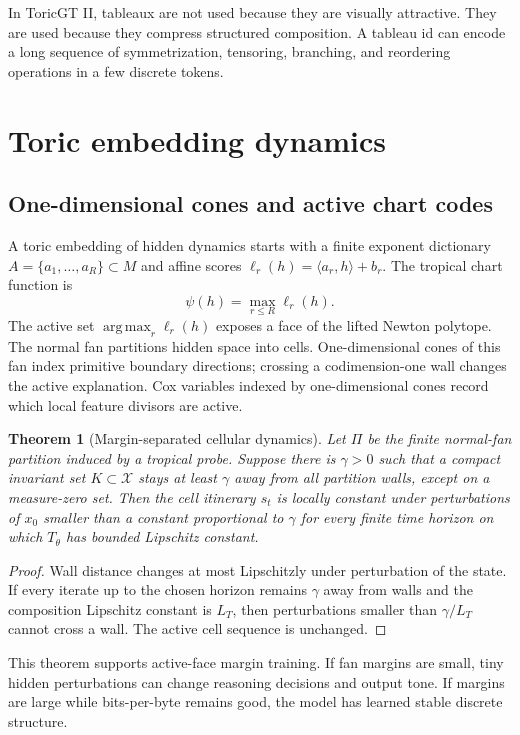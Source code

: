 \documentclass[10pt]{article}
\newtheorem{theorem}{Theorem}[section]
\newcommand{\calX}{\mathcal{X}}
\newcommand{\argmax}{\operatorname*{arg\,max}}
\numberwithin{equation}{section}
\begin{document}
In ToricGT II, tableaux are not used because they are visually attractive. They are used because they compress structured composition. A tableau id can encode a long sequence of symmetrization, tensoring, branching, and reordering operations in a few discrete tokens.

\section{Toric embedding dynamics}
\subsection{One-dimensional cones and active chart codes}
A toric embedding of hidden dynamics starts with a finite exponent dictionary $A=\{a_1,\ldots,a_R\}\subset M$ and affine scores $\ell_r(h)=\langle a_r,h\rangle+b_r$. The tropical chart function is
\begin{equation}
\psi(h)=\max_{r\le R}\ell_r(h).
\end{equation}
The active set $\argmax_r\ell_r(h)$ exposes a face of the lifted Newton polytope. The normal fan partitions hidden space into cells. One-dimensional cones of this fan index primitive boundary directions; crossing a codimension-one wall changes the active explanation. Cox variables indexed by one-dimensional cones record which local feature divisors are active.

\begin{theorem}[Margin-separated cellular dynamics]
Let $\Pi$ be the finite normal-fan partition induced by a tropical probe. Suppose there is $\gamma>0$ such that a compact invariant set $K\subset\calX$ stays at least $\gamma$ away from all partition walls, except on a measure-zero set. Then the cell itinerary $s_t$ is locally constant under perturbations of $x_0$ smaller than a constant proportional to $\gamma$ for every finite time horizon on which $T_\theta$ has bounded Lipschitz constant.
\end{theorem}
\begin{proof}
Wall distance changes at most Lipschitzly under perturbation of the state. If every iterate up to the chosen horizon remains $\gamma$ away from walls and the composition Lipschitz constant is $L_T$, then perturbations smaller than $\gamma/L_T$ cannot cross a wall. The active cell sequence is unchanged.
\end{proof}

This theorem supports active-face margin training. If fan margins are small, tiny hidden perturbations can change reasoning decisions and output tone. If margins are large while bits-per-byte remains good, the model has learned stable discrete structure.
\end{document}
